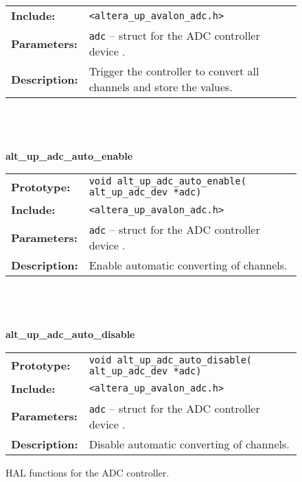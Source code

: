 \begin{figure}[h]
\begin{flushleft}
{\begin{tabular}[ht]{lp{11cm}}
	\\
	\textbf{Include:}
	&
	{\tt <altera\_up\_avalon\_adc.h>}
	\\
	{\textbf{Parameters:}}
	&
	\texttt{{adc}}
	 -- struct for the ADC controller device . 
	\\
	\textbf{Description:}
	& Trigger the controller to convert all channels and store the values.\\
\end{tabular}
\\
\\
\\
{\small \textsf{\textbf{alt\_up\_adc\_auto\_enable}}} \\
\begin{tabular}[ht]{lp{11cm}}
	\textbf{Prototype:}
	&
	\texttt{void alt\_up\_adc\_auto\_enable( alt\_up\_adc\_dev *adc)} 
	\\
	\textbf{Include:}
	&
	{\tt <altera\_up\_avalon\_adc.h>}
	\\
	{\textbf{Parameters:}}
	&
	\texttt{{adc}}
	 -- struct for the ADC controller device . 
	\\
	\textbf{Description:}
	& Enable automatic converting of channels.\\
\end{tabular}
\\
\\
\\
{\small \textsf{\textbf{alt\_up\_adc\_auto\_disable}}} \\
\begin{tabular}[ht]{lp{11cm}}
	\textbf{Prototype:}
	&
	\texttt{void alt\_up\_adc\_auto\_disable( alt\_up\_adc\_dev *adc)} 
	\\
	\textbf{Include:}
	&
	{\tt <altera\_up\_avalon\_adc.h>}
	\\
	{\textbf{Parameters:}}
	&
	\texttt{{adc}}
	 -- struct for the ADC controller device . 
	\\
	\textbf{Description:}
	& Disable automatic converting of channels.\\
\end{tabular}
 } %
	\caption{HAL functions for the ADC controller. }%
	\label{fig:hal_func}
\end{flushleft}
\end{figure} 
